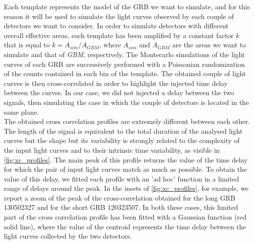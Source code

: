 \documentclass[]{spie}  %
\def \gbm{\textit{GBM}\xspace}
\begin{document}
Each template represents the model of the GRB we want to simulate, and for this reason it will be used to simulate the light curves observed by each couple of detectors we want to consider. In order to simulate detectors with different overall effective areas, each template has been amplified by a constant factor $k$ that is equal to $k=A_{sim}/A_{GBM}$, where $A_{sim}$ and $A_{GBM}$ are the areas we want to simulate and that of \gbm, respectively. The Montecarlo simulations of the light curves of each GRB are successively performed with a Poissonian randomization of the counts contained in each bin of the template. The obtained couple of light curves is then cross-correlated in order to highlight the injected time delay between the curves. In our case, we did not injected a delay between the two signals, then simulating the case in which the couple of detectors is located in the same plane. \\
The obtained cross correlation profiles are extremely different between each other. The length of the signal is equivalent to the total duration of the analysed light curves but the shape but its variability is strongly related to the complexity of the input light curves and to their intrinsic time variability, as visible in \autoref{fig:xc_profiles}. The main peak of this profile returns the value of the time delay for which the pair of input light curves match as much as possible. To obtain the value of this delay, we fitted each profile with an 'ad hoc' function in a limited range of delays around the peak. In the insets of \autoref{fig:xc_profiles}, for example, we report a zoom of the peak of the cross-correlation obtained for the long GRB 130502327 and for the short GRB 120323507. In both these cases, this limited part of the cross correlation profile has been fitted with a Gaussian function (red solid line), where the value of the centroid represents the time delay between the light curves collected by the two detectors.\\
 
\end{document}
